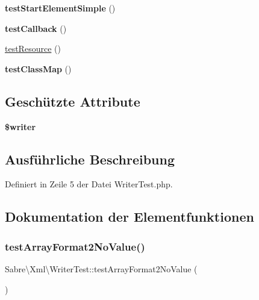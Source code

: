 \begin{DoxyCompactItemize}
{\bfseries test\+Start\+Element\+Simple} ()
\item 
\mbox{\label{class_sabre_1_1_xml_1_1_writer_test_a3426d362d14164ee00820222d4744f9c}} 
{\bfseries test\+Callback} ()
\item 
\mbox{\hyperlink{class_sabre_1_1_xml_1_1_writer_test_a1fde3957d833370dc348b6e7500feb2c}{test\+Resource}} ()
\item 
\mbox{\label{class_sabre_1_1_xml_1_1_writer_test_a75db7513775cb4fe9f907e414c54c38d}} 
{\bfseries test\+Class\+Map} ()
\end{DoxyCompactItemize}
\subsection*{Geschützte Attribute}
\begin{DoxyCompactItemize}
\item 
\mbox{\label{class_sabre_1_1_xml_1_1_writer_test_a9ec0e5650d890822d03824c85baa4c25}} 
{\bfseries \$writer}
\end{DoxyCompactItemize}


\subsection{Ausführliche Beschreibung}


Definiert in Zeile 5 der Datei Writer\+Test.\+php.



\subsection{Dokumentation der Elementfunktionen}
\mbox{\label{class_sabre_1_1_xml_1_1_writer_test_aa3d7701fcdd94a2ce29ea8aaaaf77afb}} 
\subsubsection{\texorpdfstring{test\+Array\+Format2\+No\+Value()}{testArrayFormat2NoValue()}}
{\footnotesize\ttfamily Sabre\textbackslash{}\+Xml\textbackslash{}\+Writer\+Test\+::test\+Array\+Format2\+No\+Value (\begin{DoxyParamCaption}{ }\end{DoxyParamCaption})}

